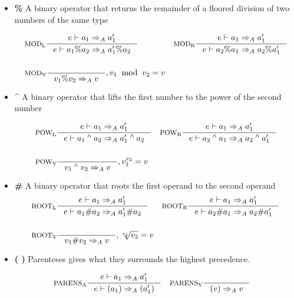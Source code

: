 \begin{itemize}
\item \textbf{\%} A binary operator that returns the remainder of a floored division of two numbers of the same type

\begin{align*}
&\inference[$\text{MOD}_\text{L}$]{e \vdash a_1 \Rightarrow_A a_1'}
                    {e \vdash a_1 \% a_2 \Rightarrow_A a_1' \% a_2}
&
&\inference[$\text{MOD}_\text{R}$]{e \vdash a_1 \Rightarrow_A a_1'}
                    {e \vdash a_2 \% a_1 \Rightarrow_A a_2 \% a_1'}
\\\\
&\inference[$\text{MOD}_\text{V}$]{}
                    {v_1 \% v_2 \Rightarrow_A v}
                    {, v_1 \;\; \textrm{mod} \;\; v_2 = v}
\end{align*}

\item \textbf{\^}  A binary operator that lifts the first number to the power of the second number

\begin{align*}
&\inference[$\text{POW}_\text{L}$]{e \vdash a_1  \Rightarrow_A a_1'}
                    {e \vdash a_1 \Twedge a_2 \Rightarrow_A a_1' \Twedge a_2}
&
&\inference[$\text{POW}_\text{R}$]{e \vdash a_1 \Rightarrow_A a_1'}
                    {e \vdash a_2 \Twedge a_1 \Rightarrow_A a_2 \Twedge a_1'}
\\\\
&\inference[$\text{POW}_\text{V}$]{}
                    {v_1 \Twedge v_2 \Rightarrow_A v}
                    {, v_1 ^ {v_2} = v}
\end{align*}

\item \textbf{\#} A binary operator that roots the first operand to the second operand
\begin{align*}
&\inference[$\text{ROOT}_\text{L}$]{e \vdash a_1 \Rightarrow_A a_1'}
                    {e \vdash a_1 \# a_2 \Rightarrow_A a_1' \# a_2}
&
&\inference[$\text{ROOT}_\text{R}$]{e \vdash a_1 \Rightarrow_A a_1'}
                    {e \vdash a_2 \# a_1 \Rightarrow_A a_2 \# a_1'}
\\\\
&\inference[$\text{ROOT}_\text{V}$]{}
                    {v_1 \# v_2 \Rightarrow_A v}
                    {, \sqrt[v_1]{v_2} = v}
\end{align*}

\item \textbf{( )} Parenteses gives what they surrounds the highest precedence.

\begin{align*}
&\inference[$\text{PARENS}_\text{A}$]{e \vdash a_1 \Rightarrow_A a_1'}
                       {e \vdash (a_1) \Rightarrow_A (a_1')}
&
&\inference[$\text{PARENS}_\text{V}$]{}
                       {(v) \Rightarrow_A v}
\end{align*}
\end{itemize}

